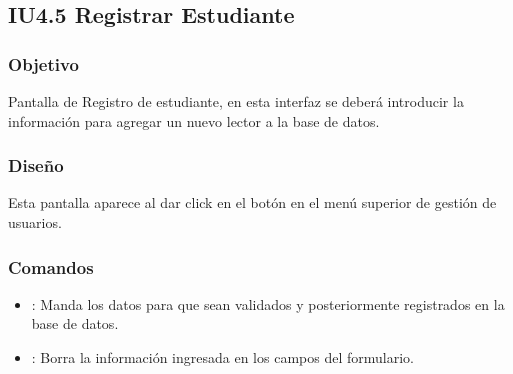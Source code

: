 \newpage
\subsection{IU4.5 Registrar Estudiante}

\subsubsection{Objetivo}
	Pantalla de Registro de estudiante, en esta interfaz se deberá introducir la información para agregar un nuevo lector a la base de datos. 

\subsubsection{Diseño}
	Esta pantalla aparece al dar click en el botón  en el menú superior de gestión de usuarios.  \\



\subsubsection{Comandos}
	\begin{itemize}
		\item {}: Manda los datos para que sean validados y posteriormente registrados en la base de datos.
		\item {}: Borra la información ingresada en los campos del formulario.  
	\end{itemize}




